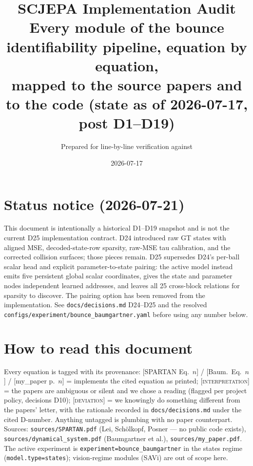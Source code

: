 \documentclass[11pt]{article}
\title{SCJEPA Implementation Audit\\
\large Every module of the bounce identifiability pipeline, equation by equation,\\
mapped to the source papers and to the code (state as of 2026-07-17, post D1--D19)}
\author{Prepared for line-by-line verification against \code{src/scjepa/}}
\date{2026-07-17}
\newcommand{\code}[1]{\texttt{\small #1}}
\newcommand{\paper}[1]{\textcolor{blue!60!black}{[#1]}}
\newcommand{\interp}{\textcolor{orange!80!black}{[\textsc{interpretation}]}}
\newcommand{\dev}{\textcolor{red!70!black}{[\textsc{deviation}]}}
\begin{document}
\maketitle

\section*{Status notice (2026-07-21)}
This document is intentionally a historical D1--D19 snapshot and is not the current D25
implementation contract. D24 introduced raw GT states with aligned MSE, decoded-state-row
sparsity, raw-MSE tau calibration, and the corrected collision surfaces; those pieces remain.
D25 supersedes D24's per-ball scalar head and explicit parameter-to-state pairing: the active
model instead emits five persistent global scalar coordinates, gives the state and parameter
nodes independent learned addresses, and leaves all 25 cross-block relations for sparsity to
discover. The pairing option has been removed from the implementation. See
\code{docs/decisions.md} D24--D25 and the resolved
\code{configs/experiment/bounce\_baumgartner.yaml} before using any number below.

\section*{How to read this document}
Every equation is tagged with its provenance:
\paper{SPARTAN Eq.~$n$} / \paper{Baum.\ Eq.~$n$} / \paper{my\_paper p.~$n$} = implements the
cited equation as printed; \interp{} = the papers are ambiguous or silent and we chose a
reading (flagged per project policy, decisions D10); \dev{} = we knowingly do something
different from the papers' letter, with the rationale recorded in \code{docs/decisions.md}
under the cited D-number. Anything untagged is plumbing with no paper counterpart.
Sources: \code{sources/SPARTAN.pdf} (Lei, Sch\"olkopf, Posner --- no public code exists),
\code{sources/dynamical\_system.pdf} (Baumgartner et al.), \code{sources/my\_paper.pdf}.
The active experiment is \code{experiment=bounce\_baumgartner} in the states regime
(\code{model.type=states}); vision-regime modules (SAVi) are out of scope here.
\end{document}

